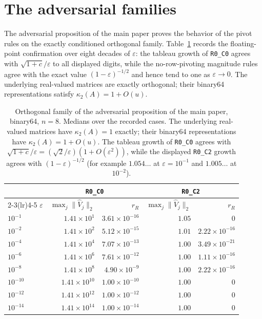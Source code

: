 \documentclass[supplement,review,onefignum,onetabnum]{siamart251216}
\begin{document}
\section{The adversarial families}
\label{sm:adversarial}

The adversarial proposition of the main paper proves the behavior of the pivot rules on the exactly conditioned
orthogonal family. Table~\ref{tab:sm-adversarial} records the floating-point confirmation over
eight decades of $\varepsilon$: the tableau growth of \texttt{R0\_C0} agrees with
$\sqrt{1+c}/\varepsilon$ to all displayed digits, while the no-row-pivoting magnitude rules agree with the
exact value $(1-\varepsilon)^{-1/2}$ and hence tend to one as $\varepsilon\to0$.  The underlying
real-valued matrices are exactly orthogonal; their binary64 representations satisfy
$\kappa_2(A)=1+O(u)$.

\begin{table}
\centering
\caption{Orthogonal family of the adversarial proposition of the main paper, binary64, $n=8$. Medians over the
recorded cases.  The underlying real-valued matrices have $\kappa_2(A)=1$ exactly; their binary64
representations have $\kappa_2(A)=1+O(u)$. The tableau growth of \texttt{R0\_C0}
agrees with $\sqrt{1+c}/\varepsilon=(\sqrt2/\varepsilon)(1+O(\varepsilon^2))$, while the displayed
\texttt{R0\_C2} growth agrees with $(1-\varepsilon)^{-1/2}$ (for example $1.054\ldots$ at
$\varepsilon=10^{-1}$ and $1.005\ldots$ at $10^{-2}$).}
\label{tab:sm-adversarial}
\begin{tabular}{lrrrr}
\hline
& \multicolumn{2}{c}{\texttt{R0\_C0}} & \multicolumn{2}{c}{\texttt{R0\_C2}} \\
\cmidrule(lr){2-3}\cmidrule(lr){4-5}
$\varepsilon$ & $\max_j\|\widehat V_j\|_2$ & $r_R$ & $\max_j\|\widehat V_j\|_2$ & $r_R$ \\
\hline
$10^{-1}$  & $1.41\times10^{1}$  & $3.61\times10^{-16}$ & $1.05$ & $0$ \\
$10^{-2}$  & $1.41\times10^{2}$  & $5.12\times10^{-15}$ & $1.01$ & $2.22\times10^{-16}$ \\
$10^{-4}$  & $1.41\times10^{4}$  & $7.07\times10^{-13}$ & $1.00$ & $3.49\times10^{-21}$ \\
$10^{-6}$  & $1.41\times10^{6}$  & $7.61\times10^{-12}$ & $1.00$ & $1.11\times10^{-16}$ \\
$10^{-8}$  & $1.41\times10^{8}$  & $4.90\times10^{-9}$  & $1.00$ & $2.22\times10^{-16}$ \\
$10^{-10}$ & $1.41\times10^{10}$ & $1.00\times10^{-10}$ & $1.00$ & $0$ \\
$10^{-12}$ & $1.41\times10^{12}$ & $1.00\times10^{-12}$ & $1.00$ & $0$ \\
$10^{-14}$ & $1.41\times10^{14}$ & $1.00\times10^{-14}$ & $1.00$ & $0$ \\
\hline
\end{tabular}
\end{table}
\end{document}
